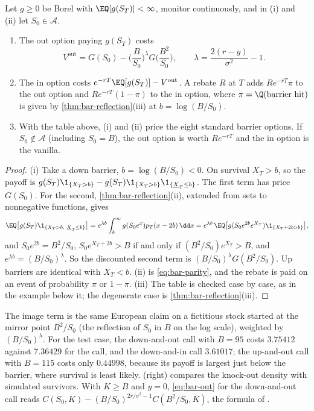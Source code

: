\begin{proposition}\label{prop:bar-images}
Let $g\ge0$ be Borel with $\EQ[g(S_T)]<\infty$, monitor continuously, and in (i) and (ii) let
$S_0\in\mathcal A$.
\begin{enumerate}[label=(\roman*)]
  \item The out option paying $g(S_T)$ costs
    \begin{equation}\label{eq:bar-out}
      V^{\mathrm{out}}=G(S_0)-\Big(\frac B{S_0}\Big)^{\lambda}G\Big(\frac{B^2}{S_0}\Big),
      \qquad\lambda=\frac{2(r-y)}{\sigma^2}-1 .
    \end{equation}
  \item The in option costs $e^{-rT}\EQ[g(S_T)]-V^{\mathrm{out}}$. A rebate $R$ at $T$ adds
    $Re^{-rT}\pi$ to the out option and $Re^{-rT}(1-\pi)$ to the in option, where
    $\pi=\Q(\text{barrier hit})$ is given by \cref{thm:bar-reflection}(iii) at $b=\log(B/S_0)$.
  \item With the table above, (i) and (ii) price the eight standard barrier options. If $S_0\notin\mathcal A$
    (including $S_0=B$), the out option is worth $Re^{-rT}$ and the in option is the vanilla.
\end{enumerate}
\end{proposition}

\begin{proof}
(i) Take a down barrier, $b=\log(B/S_0)<0$. On survival $X_T>b$, so the payoff is
$g(S_T)\1_{\{X_T>b\}}-g(S_T)\1_{\{X_T>b\}}\1_{\{\underline X_T\le b\}}$. The first term has price
$G(S_0)$. For the second, \cref{thm:bar-reflection}(ii), extended from sets to nonnegative
functions, gives
\[
  \EQ\big[g(S_T)\1_{\{X_T>b,\ \underline X_T\le b\}}\big]=e^{\lambda b}\int_b^\infty g(S_0e^x)p_T(x-2b)\,\dd x
  =e^{\lambda b}\,\EQ\big[g(S_0e^{2b}e^{X_T})\1_{\{X_T+2b>b\}}\big],
\]
and $S_0e^{2b}=B^2/S_0$, $S_0e^{X_T+2b}>B$ if and only if $(B^2/S_0)e^{X_T}>B$, and
$e^{\lambda b}=(B/S_0)^\lambda$. So the discounted second term is $(B/S_0)^\lambda G(B^2/S_0)$. Up
barriers are identical with $X_T<b$. (ii) is \eqref{eq:bar-parity}, and the rebate is paid on an
event of probability $\pi$ or $1-\pi$. (iii) The table is checked case by case, as in the example
below it; the degenerate case is \cref{thm:bar-reflection}(iii).
\end{proof}

The image term is the same European claim on a fictitious stock started at the mirror point
$B^2/S_0$ (the reflection of $S_0$ in $B$ on the log scale), weighted by $(B/S_0)^\lambda$. For the
test case, the down-and-out call with $B=95$ costs $3.75412$ against $7.36429$ for the call, and
the down-and-in call $3.61017$; the up-and-out call with $B=115$ costs only $0.44998$, because its
payoff is largest just below the barrier, where survival is least likely. 
(right) compares the knock-out density with simulated survivors. With $K\ge B$ and $y=0$,
\eqref{eq:bar-out} for the down-and-out call reads $C(S_0,K)-(B/S_0)^{2r/\sigma^2-1}C(B^2/S_0,K)$, the
formula of \textcite{merton1973}.

